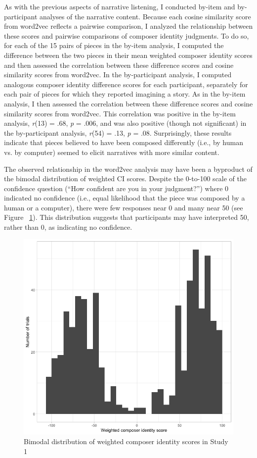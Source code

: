 \documentclass[12pt,twoside]{reedthesis}
\begin{document}
As with the previous aspects of narrative listening, I conducted by-item and by-participant analyses of the narrative content. Because each cosine similarity score from word2vec reflects a pairwise comparison, I analyzed the relationship between these scores and pairwise comparisons of composer identity judgments. To do so, for each of the 15 pairs of pieces in the by-item analysis, I computed the difference between the two pieces in their mean weighted composer identity scores and then assessed the correlation between these difference scores and cosine similarity scores from word2vec. In the by-participant analysis, I computed analogous composer identity difference scores for each participant, separately for each pair of pieces for which they reported imagining a story. As in the by-item analysis, I then assessed the correlation between these difference scores and cosine similarity scores from word2vec. This correlation was positive in the by-item analysis, \emph{r}(13) = .68, \emph{p} = .006, and was also positive (though not significant) in the by-participant analysis, \emph{r}(54) = .13, \emph{p} = .08. Surprisingly, these results indicate that pieces believed to have been composed differently (i.e., by human vs. by computer) seemed to elicit narratives with more similar content. 

The observed relationship in the word2vec analysis may have been a byproduct of the bimodal distribution of weighted CI scores. Despite the 0-to-100 scale of  the confidence question (“How confident are you in your judgment?”) where 0 indicated no confidence (i.e., equal likelihood that the piece was composed by a human or a computer), there were few responses near 0 and many near 50 (see Figure ~\ref*{fig-bimodal-dist}). This distribution suggests that participants may have interpreted 50, rather than 0, as indicating no confidence. 

\begin{figure}[h!tbp]
	\centering
	\includegraphics[scale=0.4]{weighted_dist.png}
	\caption{Bimodal distribution of weighted composer identity scores in Study 1}
	\label{fig-bimodal-dist}
\end{figure}
\end{document}
